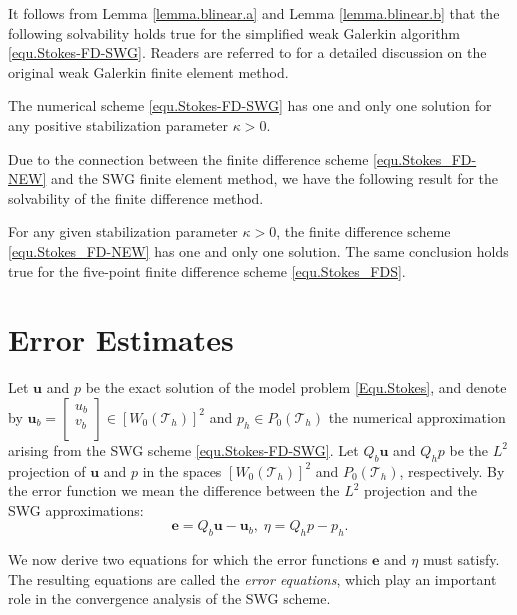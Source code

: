\documentclass[final,leqno]{siamltex704}
\def\T{{\mathcal T}}
\begin{document}
\medskip
It follows from Lemma \ref{lemma.blinear.a} and Lemma \ref{lemma.blinear.b} that the following solvability holds true for the simplified weak Galerkin algorithm \eqref{equ.Stokes-FD-SWG}. Readers are referred to \cite{WangYe_2013,wy3655,wy-stokes} for a detailed discussion on the original weak Galerkin finite element method.
\begin{theorem}
The numerical scheme \eqref{equ.Stokes-FD-SWG} has one and only one solution for any positive stabilization parameter $\kappa>0$.
\end{theorem}

\medskip


Due to the connection between the finite difference scheme \eqref{equ.Stokes_FD-NEW} and the SWG finite element method, we have the following result for the solvability of the finite difference method.
\begin{theorem}\label{DF-uniq}
For any given stabilization parameter $\kappa>0$, the finite difference scheme \eqref{equ.Stokes_FD-NEW} has one and only one solution. The same conclusion holds true for the five-point finite difference scheme \eqref{equ.Stokes_FDS}.
\end{theorem}

\section{Error Estimates}\label{sectionEEStokes}
Let $\bm{u}$ and $p$ be the exact solution of the model problem \eqref{Equ.Stokes}, and denote by $\bm{u}_b=
\begin{bmatrix}
u_{b} \\
v_{b} \\
\end{bmatrix} \in [W_0(\T_h)]^2$ and $p_h \in P_0(\T_h)$ the numerical approximation arising from the SWG scheme \eqref{equ.Stokes-FD-SWG}.
Let $Q_b\bm{u}$ and $Q_h p$ be the $L^2$ projection of $\bm{u}$ and $p$ in the spaces $[W_0(\T_h)]^2$ and $P_0(\T_h)$, respectively. By the error function we mean the difference between the $L^2$ projection and the SWG approximations:
\begin{equation}\label{equ.error}
 \bm{e}=Q_b \bm{u}-\bm{u}_b,\; \eta=Q_h p-p_h.
\end{equation}

We now derive two equations for which the error functions $\bm{e}$ and $\eta$ must satisfy. The resulting equations are called the \textit{error equations}, which play an important role in the convergence analysis of the SWG scheme.
\end{document}
